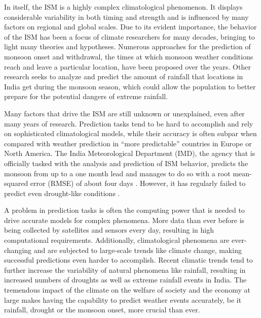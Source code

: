 In itself, the ISM is a highly complex climatological phenomenon. It displays considerable variability in both timing and strength and is influenced by many factors on regional and global scales. Due to its evident importance, the behavior of the ISM has been a focus of climate researchers for many decades, bringing to light many theories and hypotheses. Numerous approaches for the prediction of monsoon onset and withdrawal, the times at which monsoon weather conditions reach and leave a particular location, have been proposed over the years. Other research seeks to analyze and predict the amount of rainfall that locations in India get during the monsoon season, which could allow the population to better prepare for the potential dangers of extreme rainfall.

Many factors that drive the ISM are still unknown or unexplained, even after many years of research. Prediction tasks tend to be hard to accomplish and rely on sophisticated climatological models, while their accuracy is often subpar when compared with weather prediction in ``more predictable'' countries in Europe or North America. The India Meteorological Department (IMD), the agency that is officially tasked with the analysis and prediction of ISM behavior, predicts the monsoon from up to a one month lead and manages to do so with a root mean-squared error (RMSE) of about four days \citep{Pradhan.2017}. However, it has regularly failed to predict even drought-like conditions \citep{Paliwal.24.09.2017}.

A problem in prediction tasks is often the computing power that is needed to drive accurate models for complex phenomena. More data than ever before is being collected by satellites and sensors every day, resulting in high computational requirements. Additionally, climatological phenomena are ever-changing and are subjected to large-scale trends like climate change, making successful predictions even harder to accomplish. Recent climatic trends tend to further increase the variability of natural phenomena like rainfall, resulting in increased numbers of droughts as well as extreme rainfall events in India. The tremendous impact of the climate on the welfare of society and the economy at large makes having the capability to predict weather events accurately, be it rainfall, drought or the monsoon onset, more crucial than ever.

